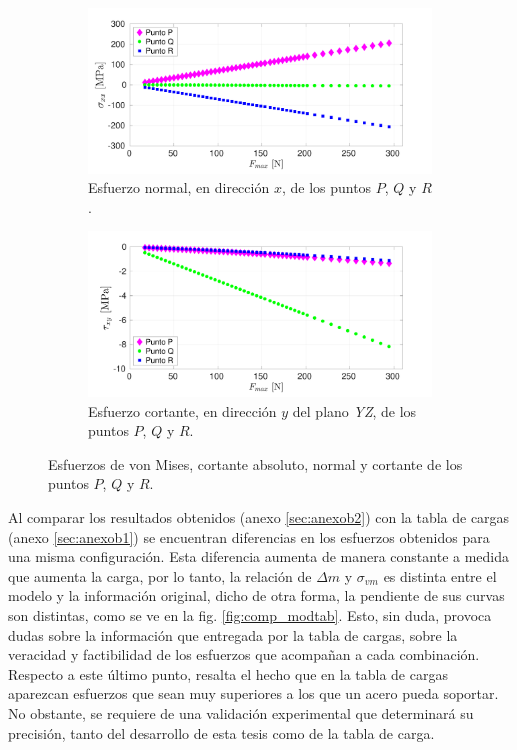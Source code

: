 \begin{figure}[p]
\centering
	\ContinuedFloat
	\begin{subfigure}{1\linewidth}
		\centering
		\includegraphics[width=\linewidth, trim={0cm 0cm 2cm 0cm},clip]{Imagenes/esf_normal.pdf}
		\caption{Esfuerzo normal, en dirección $x$, de los puntos $P$, $Q$ y $R$.}
		\label{fig:esf_normal201}
	\end{subfigure}
	\begin{subfigure}{1\linewidth}
		\centering
		\includegraphics[width=\linewidth, trim={1cm 0cm 2cm 0cm},clip]{Imagenes/esf_cortante.pdf}
		\caption{Esfuerzo cortante, en dirección $y$ del plano \textit{YZ}, de los puntos $P$, $Q$ y $R$.}
		\label{fig:esf_ms201}
	\end{subfigure}
\caption{Esfuerzos de von Mises, cortante absoluto, normal y cortante de los puntos $P$, $Q$ y $R$.}
\label{fig:esf_201}
\end{figure}

\newpage

Al comparar los resultados obtenidos (anexo \ref{sec:anexob2}) con la tabla de cargas (anexo \ref{sec:anexob1}) se encuentran diferencias en los esfuerzos obtenidos para una misma configuración. Esta diferencia aumenta de manera constante a medida que aumenta la carga, por lo tanto, la relación de $\Delta m$ y $\sigma_{vm}$ es distinta entre el modelo y la información original, dicho de otra forma, la pendiente de sus curvas son distintas, como se ve en la fig. \ref{fig:comp_modtab}. Esto, sin duda, provoca dudas sobre la información que entregada por la tabla de cargas, sobre la veracidad y factibilidad de los esfuerzos que acompañan a cada combinación. Respecto a este último punto, resalta el hecho que en la tabla de cargas aparezcan esfuerzos que sean muy superiores a los que un acero pueda soportar. No obstante, se requiere de una validación experimental que determinará su precisión, tanto del desarrollo de esta tesis como de la tabla de carga.

